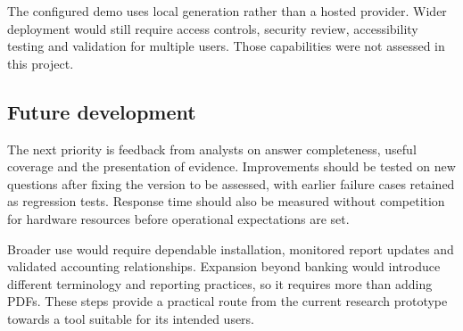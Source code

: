 The configured demo uses local generation rather than a hosted provider. Wider deployment would still require access controls, security review, accessibility testing and validation for multiple users. Those capabilities were not assessed in this project.

\subsection{Future development}
The next priority is feedback from analysts on answer completeness, useful coverage and the presentation of evidence. Improvements should be tested on new questions after fixing the version to be assessed, with earlier failure cases retained as regression tests. Response time should also be measured without competition for hardware resources before operational expectations are set.

Broader use would require dependable installation, monitored report updates and validated accounting relationships. Expansion beyond banking would introduce different terminology and reporting practices, so it requires more than adding PDFs. These steps provide a practical route from the current research prototype towards a tool suitable for its intended users.
